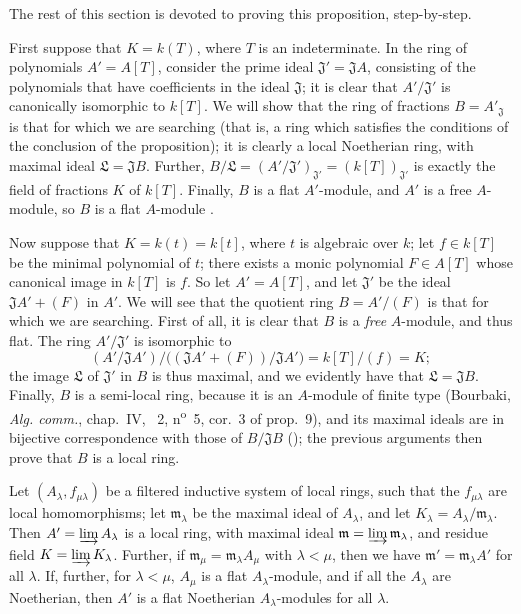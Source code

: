 The rest of this section is devoted to proving this proposition, step-by-step.
\begin{env}[10.3.1.1]
\label{0.10.3.1.1}
First suppose that $K=k(T)$, where $T$ is an indeterminate.
In the ring of polynomials $A'=A[T]$, consider the prime ideal $\mathfrak{J}'=\mathfrak{J}A$, consisting of the
polynomials that have coefficients in the ideal $\mathfrak{J}$;
it is clear that $A'/\mathfrak{J}'$ is canonically isomorphic to $k[T]$.
We will show that the ring of fractions $B=A'_\mathfrak{J}$ is that for which we are searching (that is, a ring which satisfies the conditions of the conclusion of the proposition);
it is clearly a local Noetherian ring, with maximal ideal $\mathfrak{L}=\mathfrak{J}B$.
Further, $B/\mathfrak{L}=(A'/\mathfrak{J}')_{\mathfrak{J}'}=(k[T])_{\mathfrak{J}'}$ is exactly the field of fractions $K$ of $k[T]$.
Finally, $B$ is a flat $A'$-module, and $A'$ is a free $A$-module, so $B$ is a flat $A$-module .
\end{env}

\begin{env}[10.3.1.2]
\label{0.10.3.1.2}
Now suppose that $K=k(t)=k[t]$, where $t$ is algebraic over $k$;
let $f\in k[T]$ be the minimal polynomial of $t$;
there exists a monic polynomial $F\in A[T]$ whose canonical image in $k[T]$ is $f$.
So let $A'=A[T]$, and let $\mathfrak{J}'$ be the ideal $\mathfrak{J}A'+(F)$ in $A'$.
We will see that the quotient ring $B=A'/(F)$ is that for which we are searching.
First of all, it is clear that $B$ is a \emph{free} $A$-module, and thus flat.
The ring $A'/\mathfrak{J}'$ is isomorphic to
\[
  (A'/\mathfrak{J}A')/\big((\mathfrak{J}A'+(F))/\mathfrak{J}A'\big)=k[T]/(f)=K;
\]
the image $\mathfrak{L}$ of $\mathfrak{J}'$ in $B$ is thus maximal, and we evidently have that $\mathfrak{L}=\mathfrak{J}B$.
Finally, $B$ is a semi-local ring, because it is an $A$-module of finite type (Bourbaki, \emph{Alg. comm.}, chap.~IV, \textsection~2, n\textsuperscript{o}~5, cor.~3 of prop.~9), and its maximal ideals are in bijective correspondence with those of $B/\mathfrak{J}B$ (\cite[vol.~I, p.~259]{I-13});
the previous arguments then prove that $B$ is a local ring.
\end{env}

\begin{lemma}[10.3.1.3]
\label{0.10.3.1.3}
Let $(A_\lambda,f_{\mu\lambda})$ be a filtered inductive system of local rings, such that the $f_{\mu\lambda}$ are local homomorphisms;
let $\mathfrak{m}_\lambda$ be the maximal ideal of $A_\lambda$, and let $K_\lambda=A_\lambda/\mathfrak{m}_\lambda$.
Then $A'=\varinjlim A_\lambda$ is a local ring, with maximal ideal $\mathfrak{m}=\varinjlim\mathfrak{m}_\lambda$, and residue field $K=\varinjlim K_\lambda$.
Further, if $\mathfrak{m}_\mu=\mathfrak{m}_\lambda A_\mu$ with $\lambda<\mu$, then we have $\mathfrak{m}'=\mathfrak{m}_\lambda A'$ for all $\lambda$.
If, further, for $\lambda<\mu$, $A_\mu$ is a flat $A_\lambda$-module, and if all the $A_\lambda$ are Noetherian, then $A'$ is a flat Noetherian $A_\lambda$-modules for all $\lambda$.
\end{lemma}

